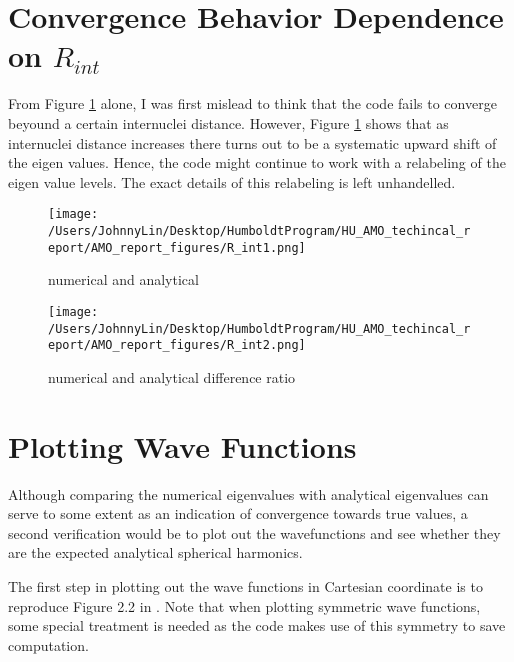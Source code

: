 \documentclass [11pt,a4paper]{report}
\begin{document}
%
%
\section{Convergence Behavior Dependence on $R_{int}$}
\label{sec:R_int_convergence}
From Figure \ref{R_int1} alone, I was first mislead to think that the code fails to converge beyound a certain internuclei distance. However, Figure \ref{R_int1} shows that as internuclei distance increases there turns out to be a systematic upward shift of the eigen values. Hence, the code might continue to work with a relabeling of the eigen value levels. The exact details of this relabeling is left unhandelled.

\begin{figure}[H]
  \centering
  \texttt{[image: /Users/JohnnyLin/Desktop/HumboldtProgram/HU\_AMO\_techincal\_report/AMO\_report\_figures/R\_int1.png]}
  \caption{numerical and analytical}
  \label{R_int1}
\end{figure}

\begin{figure}[H]
  \centering
  \texttt{[image: /Users/JohnnyLin/Desktop/HumboldtProgram/HU\_AMO\_techincal\_report/AMO\_report\_figures/R\_int2.png]}
  \caption{numerical and analytical difference ratio}
  \label{R_int2}
\end{figure}



%
%
\section{Plotting Wave Functions}
\label{sec:plotting_wave_functions}
Although comparing the numerical eigenvalues with analytical eigenvalues can serve to some extent as an indication of convergence towards true values, a second verification would be to plot out the wavefunctions and see whether they are the expected analytical spherical harmonics.

The first step in plotting out the wave functions in Cartesian coordinate is to reproduce Figure 2.2 in \cite{YulianThesis}. Note that when plotting symmetric wave functions, some special treatment is needed as the code makes use of this symmetry to save computation.
\end{document}
